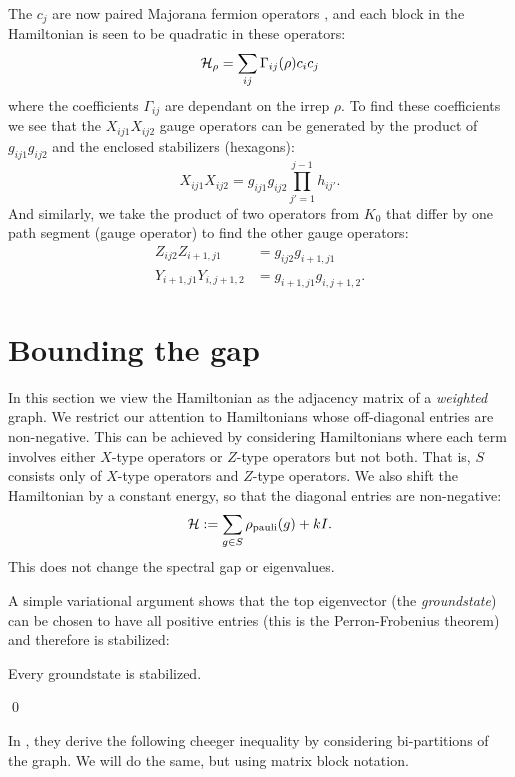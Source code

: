 \documentclass[12pt,notitlepage,longbibliography,nofootinbib,tightenlines]{revtex4}
\begin{document}
The $c_j$ are now paired Majorana fermion operators \cite{Kitaev2006}, 
and each block in the Hamiltonian
is seen to be quadratic in these operators:
$$
    \mathcal{H}_\rho = \sum_{ij} \Gamma_{ij}(\rho) c_i c_j
$$
where the coefficients $\Gamma_{ij}$
are dependant on the irrep $\rho.$
To find these coefficients we see that
the $X_{ij1}X_{ij2}$
gauge operators can be generated
by the product of 
$g_{ij1}g_{ij2}$ and the enclosed stabilizers (hexagons):
$$X_{ij1}X_{ij2}=g_{ij1}g_{ij2}\prod_{j'=1}^{j-1} h_{ij'}.$$
And similarly, we take the product
of two operators from $K_0$ that differ
by one path segment (gauge operator) to
find the other gauge operators:
\begin{align*}
Z_{ij2}Z_{i+1,j1} &= g_{ij2} g_{i+1,j1} \\
Y_{i+1,j1}Y_{i,j+1,2} &= g_{i+1,j1}g_{i,j+1,2}.
\end{align*}


\section{Bounding the gap}

In this section we view the Hamiltonian as the adjacency matrix of
a {\it weighted} graph.
We restrict our attention to Hamiltonians whose off-diagonal entries
are non-negative.
This can be achieved by considering Hamiltonians where each term
involves either $X$-type operators or $Z$-type operators but not both.
That is, $S$ consists only of $X$-type operators and $Z$-type operators.
We also shift the Hamiltonian by a constant energy, so that
the diagonal entries are non-negative:
$$
\mathcal{H} := \sum_{g\in S} \rho_{\mathrm{pauli}}(g) + kI.
$$
This does not change
the spectral gap or eigenvalues.

A simple variational argument
shows that the top eigenvector (the {\it groundstate})
can be chosen to have all positive entries
(this is the Perron-Frobenius theorem)
and therefore is stabilized:

Every groundstate is stabilized.

\qed


In \cite{Friedland2002}, they derive the following cheeger inequality
by considering bi-partitions of the graph. We will do the
same, but using matrix block notation.
\end{document}
